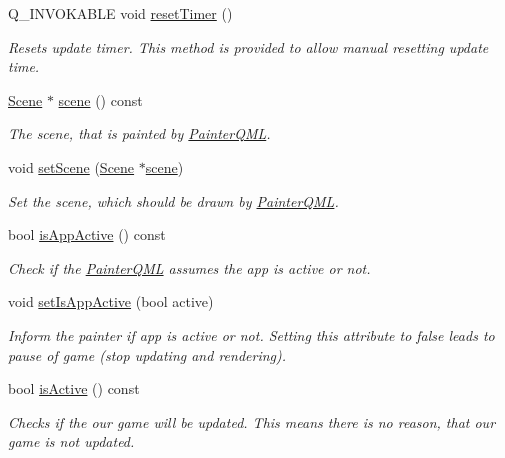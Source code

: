 \begin{DoxyCompactItemize}
Q\+\_\+\+I\+N\+V\+O\+K\+A\+B\+L\+E void \hyperlink{class_painter_q_m_l_a401a8a8b2406679b61fe326a37e97b6a}{reset\+Timer} ()
\begin{DoxyCompactList}\small\item\em Resets update timer. This method is provided to allow manual resetting update time. \end{DoxyCompactList}\item 
\hyperlink{class_scene}{Scene} $\ast$ \hyperlink{class_painter_q_m_l_a6694ad2cfda4aefaffc0a3151a2b09dd}{scene} () const 
\begin{DoxyCompactList}\small\item\em The scene, that is painted by \hyperlink{class_painter_q_m_l}{Painter\+Q\+M\+L}. \end{DoxyCompactList}\item 
void \hyperlink{class_painter_q_m_l_a81288bcb25e5b985eea33b26ede7931a}{set\+Scene} (\hyperlink{class_scene}{Scene} $\ast$\hyperlink{class_painter_q_m_l_a59b4d398bc7880e59bc8296c2669aaab}{scene})
\begin{DoxyCompactList}\small\item\em Set the scene, which should be drawn by \hyperlink{class_painter_q_m_l}{Painter\+Q\+M\+L}. \end{DoxyCompactList}\item 
bool \hyperlink{class_painter_q_m_l_aea7b18053c645bf7c1eda6dd00715888}{is\+App\+Active} () const 
\begin{DoxyCompactList}\small\item\em Check if the \hyperlink{class_painter_q_m_l}{Painter\+Q\+M\+L} assumes the app is active or not. \end{DoxyCompactList}\item 
void \hyperlink{class_painter_q_m_l_a71be24e10048b456a566d2a3c9a8992b}{set\+Is\+App\+Active} (bool active)
\begin{DoxyCompactList}\small\item\em Inform the painter if app is active or not. Setting this attribute to false leads to pause of game (stop updating and rendering). \end{DoxyCompactList}\item 
bool \hyperlink{class_painter_q_m_l_a391bd3c26f57dfcb3177318595c89353}{is\+Active} () const 
\begin{DoxyCompactList}\small\item\em Checks if the our game will be updated. This means there is no reason, that our game is not updated. \end{DoxyCompactList}\end{DoxyCompactItemize}
